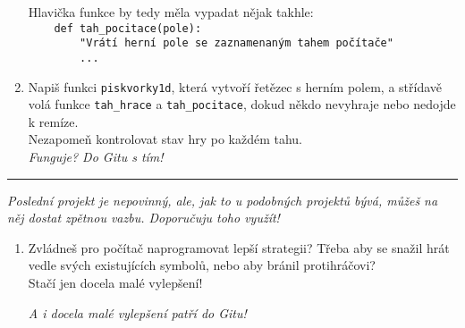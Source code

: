 \documentclass[a4paper,10pt]{article}
\newcommand\startsection[1]{
     \vspace{0.2ex}
    \hrule
    {\fontspec{Oxygen} \tiny
     \vspace{-1ex}
     \emph{#1}
     \vspace{-1.5em}
    }
}
\begin{document}
\begin{enumerate}[resume]
    Hlavička funkce by tedy měla vypadat nějak takhle:
\\\verb+    def tah_pocitace(pole):+
\\\verb+        "Vrátí herní pole se zaznamenaným tahem počítače"+
\\\verb+        ...+

\item Napiš funkci \texttt{piskvorky1d}, která vytvoří řetězec s herním polem,
    a střídavě volá funkce \texttt{tah\_hrace} a \texttt{tah\_pocitace},
    dokud někdo nevyhraje nebo nedojde k remíze.
    \\Nezapomeň kontrolovat stav hry po každém tahu.
    \\\emph{\small Funguje? Do Gitu s tím!}

\end{enumerate}

\startsection{Poslední projekt je nepovinný, ale, jak to u podobných projektů bývá, můžeš na něj dostat zpětnou vazbu. Doporučuju toho využít!}

\begin{enumerate}[resume]

\item Zvládneš pro počítač naprogramovat lepší strategii?
    Třeba aby se snažil hrát vedle svých existujících symbolů,
    nebo aby bránil protihráčovi?
    \\Stačí jen docela malé vylepšení!

    \emph{\small A i docela malé vylepšení patří do Gitu!}

\end{enumerate}
\end{document}
